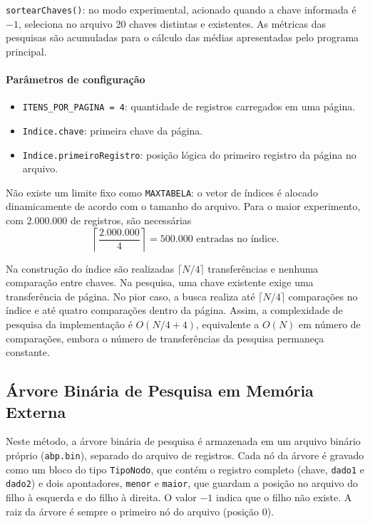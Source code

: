 \documentclass[12pt,a4paper]{article}
\begin{document}
\texttt{sortearChaves()}: no modo experimental, acionado quando a chave informada é
$-1$, seleciona no arquivo 20 chaves distintas e existentes. As métricas das pesquisas
são acumuladas para o cálculo das médias apresentadas pelo programa principal.

\paragraph{Parâmetros de configuração}
\begin{itemize}
    \item \texttt{ITENS\_POR\_PAGINA = 4}: quantidade de registros carregados em uma página.
    \item \texttt{Indice.chave}: primeira chave da página.
    \item \texttt{Indice.primeiroRegistro}: posição lógica do primeiro registro da página no arquivo.
\end{itemize}

Não existe um limite fixo como \texttt{MAXTABELA}: o vetor de índices é alocado
dinamicamente de acordo com o tamanho do arquivo. Para o maior experimento, com
2.000.000 de registros, são necessárias
\[
\left\lceil\frac{2.000.000}{4}\right\rceil=500.000
\text{ entradas no índice}.
\]

Na construção do índice são realizadas $\lceil N/4\rceil$ transferências e nenhuma
comparação entre chaves. Na pesquisa, uma chave existente exige uma transferência de
página. No pior caso, a busca realiza até $\lceil N/4\rceil$ comparações no índice e
até quatro comparações dentro da página. Assim, a complexidade de pesquisa da
implementação é $O(N/4+4)$, equivalente a $O(N)$ em número de comparações, embora o
número de transferências da pesquisa permaneça constante.

\newpage

\subsection{Árvore Binária de Pesquisa em Memória Externa}

Neste método, a árvore binária de pesquisa é armazenada em um arquivo binário próprio
(\texttt{abp.bin}), separado do arquivo de registros. Cada nó da árvore é gravado como
um bloco do tipo \texttt{TipoNodo}, que contém o registro completo (chave, \texttt{dado1}
e \texttt{dado2}) e dois apontadores, \texttt{menor} e \texttt{maior}, que guardam a
posição no arquivo do filho à esquerda e do filho à direita. O valor $-1$ indica que o
filho não existe. A raiz da árvore é sempre o primeiro nó do arquivo (posição 0).
\end{document}
